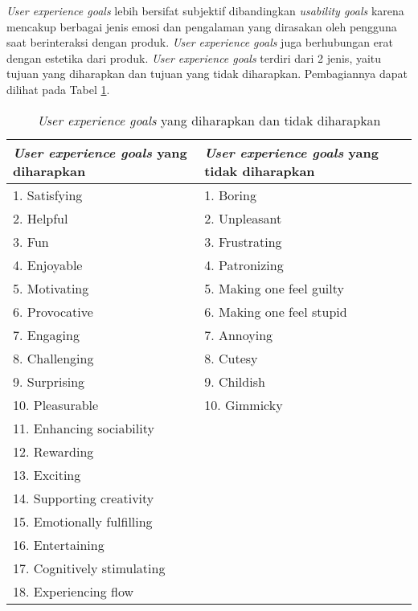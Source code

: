 \textit{User experience goals} lebih bersifat subjektif dibandingkan \textit{usability goals} karena mencakup berbagai jenis emosi dan pengalaman yang dirasakan oleh pengguna saat berinteraksi dengan produk. \textit{User experience goals} juga berhubungan erat dengan estetika dari produk. \textit{User experience goals} terdiri dari 2 jenis, yaitu tujuan yang diharapkan dan tujuan yang tidak diharapkan. \parencite{sharp2019interaction} Pembagiannya dapat dilihat pada Tabel \ref{tab:ux_goals}.

\begin{table}[h]
  \fontsize{10}{12}
  \caption{\textit{User experience goals} yang diharapkan dan tidak diharapkan}
  \label{tab:ux_goals}
  \vspace{0.25cm}
  \begin{center}
      \begin{tabular}{|l|l|}
            \hline
            \textit{User experience goals} yang diharapkan & \textit{User experience goals} yang tidak diharapkan \tabularnewline
            \hline
            1.	Satisfying              & 1.  Boring                  \tabularnewline
            2.	Helpful                 & 2.  Unpleasant              \tabularnewline
            3.	Fun                     & 3.  Frustrating             \tabularnewline
            4.	Enjoyable               & 4.  Patronizing             \tabularnewline
            5.	Motivating              & 5.  Making one feel guilty  \tabularnewline
            6.	Provocative             & 6.  Making one feel stupid  \tabularnewline
            7.	Engaging                & 7.  Annoying                \tabularnewline
            8.	Challenging             & 8.  Cutesy                  \tabularnewline
            9.	Surprising              & 9.  Childish                \tabularnewline
            10.	Pleasurable             & 10. Gimmicky                \tabularnewline
            11.	Enhancing sociability   &                             \tabularnewline
            12.	Rewarding               &                             \tabularnewline
            13.	Exciting                &                             \tabularnewline
            14.	Supporting creativity   &                             \tabularnewline
            15.	Emotionally fulfilling  &                             \tabularnewline
            16.	Entertaining            &                             \tabularnewline
            17.	Cognitively stimulating &                             \tabularnewline
            18.	Experiencing flow       &                             \tabularnewline
            \hline
        \end{tabular}
    \end{center}
\end{table}


